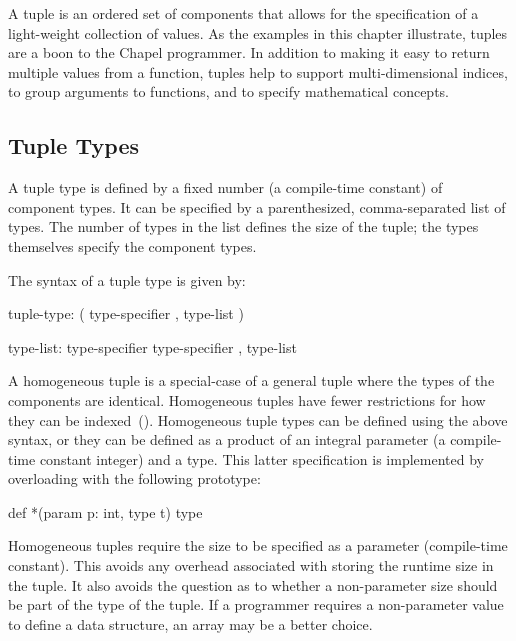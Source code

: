 \label{Tuples}

A tuple is an ordered set of components that allows for the
specification of a light-weight collection of values.  As the examples
in this chapter illustrate, tuples are a boon to the Chapel
programmer.  In addition to making it easy to return multiple values
from a function, tuples help to support multi-dimensional indices, to
group arguments to functions, and to specify mathematical concepts.

\subsection{Tuple Types}
\label{Tuple_Types}

A tuple type is defined by a fixed number (a compile-time constant) of
component types.  It can be specified by a parenthesized,
comma-separated list of types.  The number of types in the list
defines the size of the tuple; the types themselves specify the
component types.

The syntax of a tuple type is given by:
\begin{syntax}
tuple-type:
  ( type-specifier , type-list )

type-list:
  type-specifier
  type-specifier , type-list
\end{syntax}

A homogeneous tuple is a special-case of a general tuple where the
types of the components are identical.  Homogeneous tuples have fewer
restrictions for how they can be indexed~().
Homogeneous tuple types can be defined using the above syntax, or they
can be defined as a product of an integral parameter (a compile-time
constant integer) and a type.  This latter specification is
implemented by overloading \chpl{*} with the following prototype:
\begin{chapel}
def *(param p: int, type t) type
\end{chapel}

\begin{rationale}
Homogeneous tuples require the size to be specified as a parameter
(compile-time constant).  This avoids any overhead associated with
storing the runtime size in the tuple.  It also avoids the question as
to whether a non-parameter size should be part of the type of the
tuple.  If a programmer requires a non-parameter value to define a
data structure, an array may be a better choice.
\end{rationale}

